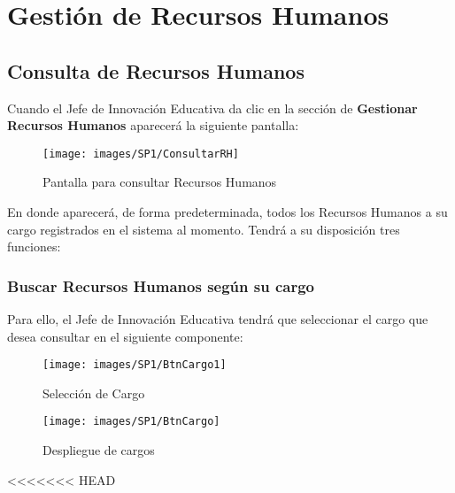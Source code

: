 
\chapter{Gestión de Recursos Humanos}
    \section{Consulta de Recursos Humanos}
        Cuando el Jefe de Innovación Educativa da clic en la sección de \textbf{Gestionar Recursos Humanos} aparecerá la siguiente pantalla:


        \begin{figure}[!hbtp]
        	\centering
        	\hypertarget{consultarrh}{\texttt{[image: images/SP1/ConsultarRH]}}
        	\caption{Pantalla para consultar Recursos Humanos}
        	\label{consultarrh}
        \end{figure}

        En donde aparecerá, de forma predeterminada, todos los Recursos Humanos a su cargo registrados en el sistema al momento. Tendrá a su disposición tres funciones:

    	\subsection{Buscar Recursos Humanos según su cargo}

        	Para ello, el Jefe de Innovación Educativa tendrá que seleccionar el cargo que desea consultar en el siguiente componente:

        	\begin{figure}[!hbtp]
        		\centering
        		\hypertarget{cargo1}{\texttt{[image: images/SP1/BtnCargo1]}}
        		\caption{Selección de Cargo}
        		\label{cargo1}
        	\end{figure}

        	\begin{figure}[!hbtp]
        		\centering
        		\hypertarget{cargo}{\texttt{[image: images/SP1/BtnCargo]}}
        		\caption{Despliegue de cargos}
        		\label{cargo}
        	\end{figure}
<<<<<<< HEAD

